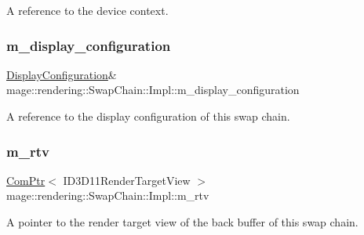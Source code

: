 A reference to the device context. \hypertarget{classmage_1_1rendering_1_1_swap_chain_1_1_impl_a8acbe60edb384725707d9b393790293f}{}\label{classmage_1_1rendering_1_1_swap_chain_1_1_impl_a8acbe60edb384725707d9b393790293f} 
\subsubsection{\texorpdfstring{m\+\_\+display\+\_\+configuration}{m\_display\_configuration}}
{\footnotesize\ttfamily \hyperlink{classmage_1_1rendering_1_1_display_configuration}{Display\+Configuration}\& mage\+::rendering\+::\+Swap\+Chain\+::\+Impl\+::m\+\_\+display\+\_\+configuration\hspace{0.3cm}{\ttfamily [private]}}

A reference to the display configuration of this swap chain. \hypertarget{classmage_1_1rendering_1_1_swap_chain_1_1_impl_a7ee01074ddbc2665e8b06f61a5eb3528}{}\label{classmage_1_1rendering_1_1_swap_chain_1_1_impl_a7ee01074ddbc2665e8b06f61a5eb3528} 
\subsubsection{\texorpdfstring{m\+\_\+rtv}{m\_rtv}}
{\footnotesize\ttfamily \hyperlink{namespacemage_ae74f374780900893caa5555d1031fd79}{Com\+Ptr}$<$ I\+D3\+D11\+Render\+Target\+View $>$ mage\+::rendering\+::\+Swap\+Chain\+::\+Impl\+::m\+\_\+rtv\hspace{0.3cm}{\ttfamily [private]}}

A pointer to the render target view of the back buffer of this swap chain. \hypertarget{classmage_1_1rendering_1_1_swap_chain_1_1_impl_aced5e9cea58432f63e62f133def982c9}{}\label{classmage_1_1rendering_1_1_swap_chain_1_1_impl_aced5e9cea58432f63e62f133def982c9} 
